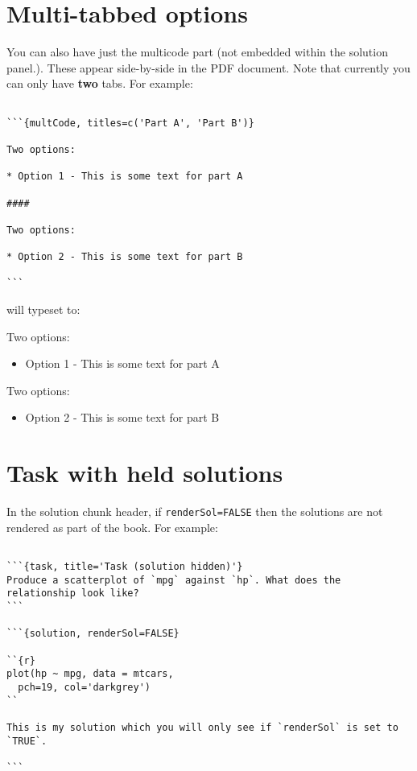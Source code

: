\documentclass[
  oneside]{krantz}
\providecommand{\tightlist}{%
  \setlength{\itemsep}{0pt}\setlength{\parskip}{0pt}}
\newcommand{\bmp}{\begin{minipage}[c]{0.5\textwidth}}
\newcommand{\emp}{\end{minipage}}
\newcommand{\bblockST}[1]{\begin{tcolorbox}[title = #1, colframe=taskCol1, breakable, parbox = false]}
\newcommand{\eblockST}{\end{tcolorbox}}
\theoremstyle{definition}
\theoremstyle{definition}
\theoremstyle{definition}
\theoremstyle{remark}
\begin{document}
\hypertarget{multi-tabbed-options}{%
\section{Multi-tabbed options}\label{multi-tabbed-options}}

You can also have just the multicode part (not embedded within the solution panel.). These appear side-by-side in the PDF document. Note that currently you can only have \textbf{two} tabs. For example:

\begin{verbatim}

```{multCode, titles=c('Part A', 'Part B')}

Two options: 

* Option 1 - This is some text for part A

####

Two options:
    
* Option 2 - This is some text for part B

```
\end{verbatim}

will typeset to:

\bmp
\bblockST{Part A}

Two options:

\begin{itemize}
\tightlist
\item
  Option 1 - This is some text for part A
\end{itemize}

\eblockST
\emp
\hspace{0.01\textwidth}
\bmp\bblockST{Part B}

Two options:

\begin{itemize}
\tightlist
\item
  Option 2 - This is some text for part B
\end{itemize}

\eblockST
\emp

\hypertarget{task-with-held-solutions}{%
\section{Task with held solutions}\label{task-with-held-solutions}}

In the solution chunk header, if \texttt{renderSol=FALSE} then the solutions are not rendered as part of the book. For example:

\begin{verbatim}

```{task, title='Task (solution hidden)'}
Produce a scatterplot of `mpg` against `hp`. What does the relationship look like?
```

```{solution, renderSol=FALSE}

``{r}
plot(hp ~ mpg, data = mtcars, 
  pch=19, col='darkgrey')
``

This is my solution which you will only see if `renderSol` is set to `TRUE`.

```
\end{verbatim}
\end{document}
